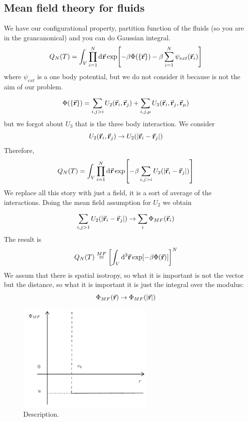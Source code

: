 \documentclass[../main/main.tex]{subfiles}
\begin{document}
\subsection{Mean field theory for fluids}
We have our configurational property, partition function of the fluids (so you are in the grancanonical) and you can do Gaussian integral.
\begin{equation}
  Q_N (T) = \int_{V}^{} \prod_{i=1}^{N}  \dd[]{\va{r}}  \exp [-\beta \Phi (\{ \va{r} \}  ) - \beta \sum_{i=1}^{N} \psi _{ext}  (\va{r}_i)]
\end{equation}
where \( \psi _{ext} \) is a one body potential, but we do not consider it because is not the aim of our problem.
\begin{equation}
  \Phi (\{ \va{r} \}  ) = \sum_{i,j>i}^{}  U_2 (\va{r}_i,\va{r}_j) + \sum_{i,j, \mu }^{} U_3 (\va{r}_i, \va{r}_j, \va{r}_ \mu )
\end{equation}
but we forgot about \( U_3 \) that is the three body interaction. We consider
\begin{equation}
   U_2 (\va{r}_i,\va{r}_j) \rightarrow U_2 ( \abs{\va{r}_i - \va{r}_j} )
\end{equation}
Therefore,
\begin{equation}
  Q_N (T) = \int_{V}^{} \prod_{i=1}^{N}  \dd[]{\va{r}}  \exp [-\beta \sum_{i,j > i }^{}  U_2 ( \abs{\va{r}_i - \va{r}_j} ) ]
\end{equation}
We replace all this story with just a field, it is a sort of average of the interactions. Doing the mean field assumption for \( U_2 \) we obtain
\begin{equation}
  \sum_{i,j > 1 }^{}  U_2 ( \abs{\va{r}_i - \va{r}_j} ) \rightarrow \sum_{i}^{} \Phi _{MF} (\va{r}_i)
\end{equation}
The result is
\begin{equation}
    Q_N (T) \overset{MF}{=}  \qty[\int_{V}^{}  \dd[3]{\va{r}}  \exp [-\beta \Phi (\va{r}) ] ]^N
\end{equation}
We assum that there is spatial isotropy, so what it is important is not the vector but the distance, so what it is important it is just the integral over the modulus:
\begin{equation}
  \Phi _{MF} (\va{r}) \rightarrow \Phi _{MF} (\abs{\va{r}} )
\end{equation}

\begin{figure}[h!]
\centering
\includegraphics[width=0.6\textwidth]{../lessons/14_image/1.pdf}
\caption{\label{fig:} Description.}
\end{figure}
\end{document}
